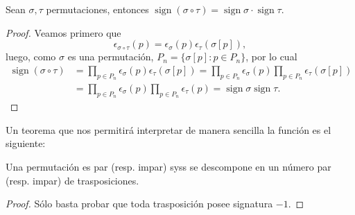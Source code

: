 \documentclass[11pt,oneside]{book}
\DeclareMathOperator{\sign}{sign}
\begin{document}
\begin{thm}
Sean $\sigma,\tau$ permutaciones, entonces $\sign(\sigma\circ\tau)=\sign\sigma\cdot\sign\tau$.
\end{thm}
\begin{proof}
Veamos primero que
$$\epsilon_{\sigma\circ\tau}(p)=\epsilon_\sigma(p)\epsilon_\tau(\sigma[p]),$$
luego, como $\sigma$ es una permutación, $P_n=\{\sigma[p]:p\in P_n\}$, por lo cual
\begin{align*}
\sign(\sigma\circ\tau)&=\prod_{p\in P_n}\epsilon_\sigma(p)\epsilon_\tau(\sigma[p])=\prod_{p\in P_n}\epsilon_\sigma(p)\prod_{p\in P_n}\epsilon_\tau(\sigma[p])\\
&=\prod_{p\in P_n}\epsilon_\sigma(p)\prod_{p\in P_n}\epsilon_\tau(p)=\sign\sigma\sign\tau.
\end{align*}
\end{proof}
Un teorema que nos permitirá interpretar de manera sencilla la función es el siguiente:
\begin{thm}
Una permutación es par (resp. impar) syss se descompone en un número par (resp. impar) de trasposiciones.
\end{thm}
\begin{proof}
Sólo basta probar que toda trasposición posee signatura $-1$.
\end{proof}
\end{document}
